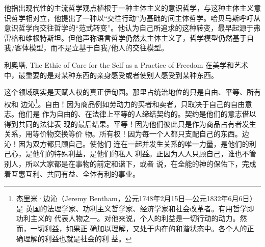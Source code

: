 他指出现代性的主流哲学观点植根于一种主体主义的意识哲学，与这种主体主义意识哲学相对立，他提出了一种以“交往行动”为基础的间主体哲学。哈贝马斯呼吁从意识哲学向交往哲学的“范式转变”。他认为自己所追求的这种转变，最早起源于弗雷格和维根特斯坦。但他声称语言哲学仍然太主体主义了，哲学模型仍然基于自我/客体模型，而不是立基于自我/他人的交往模型。

利奥塔, The Ethic of Care for the Self as a Practice of Freedom 在美学和艺术中，最重要的是对某种东西的亲身感受或者使别人感受到某种东西。




这个领域确实是天赋人权的真正伊甸园。那里占统治地位的只是自由、平等、所有权和
边沁\footnote{杰里米·边沁（Jeremy Bentham，公元1748年2月15日—公元1832年6月6日）是
  英国的法理学家、功利主义哲学家、经济学家和社会改革者。有用哲学即功利主义的
  代表人物之一。对他来说，个人的利益是一切行动的动力。然而，一切利益，如果正
  确加以理解，又处于内在的和谐状态中。各个人的正确理解的利益也就是社会的利
  益。}。自由！因为商品例如劳动力的买者和卖者，只取决于自己的自由意志。他们是
作为自由的、在法律上平等的人缔结契约的。契约是他们的意志借以得到共同的法律表
现的最后结果。平等！因为他们彼此只是作为商品占有者发生关系，用等价物交换等价
物。所有权！因为每一个人都只支配自己的东西。边沁！因为双方都只顾自己。使他们
连在一起并发生关系的唯一力量，是他们的利己心，是他们的特殊利益，是他们的私人
利益。正因为人人只顾自己，谁也不管别人，所以大家都是在事物的前定和谐下，或者
说，在全能的神的保佑下，完成着互惠互利、共同有益、全体有利的事业。
